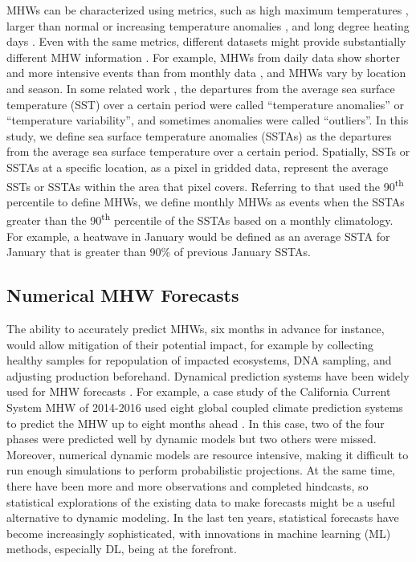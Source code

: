 \documentclass[11pt, a4paper]{article}
\begin{document}
MHWs can be characterized using metrics, such as high maximum temperatures \citep{berkelmans2004comparison}, larger than normal or increasing temperature anomalies \citep{smale2013extreme}, and long degree heating days \citep{maynard2008reeftemp}. Even with the same metrics, different datasets might provide substantially different MHW information \citep{hobday2016hierarchical}. For example, MHWs from daily data show shorter and more intensive events than from monthly data \citep{hobday2016hierarchical}, and MHWs vary by location and season. In some related work \citep{ham2019deep,pravallika2022prediction,taylor2022deep}, the departures from the average sea surface temperature (SST) over a certain period were called ``temperature anomalies'' or ``temperature variability'', and sometimes anomalies were called ``outliers''. In this study, we define sea surface temperature anomalies (SSTAs) as the departures from the average sea surface temperature over a certain period. Spatially, SSTs or SSTAs at a specific location, as a pixel in gridded data, represent the average SSTs or SSTAs within the area that pixel covers. Referring to \citet{hobday2016hierarchical} that used the 90\textsuperscript{th} percentile to define MHWs, we define monthly MHWs as events when the SSTAs greater than the 90\textsuperscript{th} percentile of the SSTAs based on a monthly climatology. For example, a heatwave in January would be defined as an average SSTA for January that is greater than 90\% of previous January SSTAs.

\subsection{Numerical MHW Forecasts}

The ability to accurately predict MHWs, six months in advance for instance, would allow mitigation of their potential impact, for example by collecting healthy samples for repopulation of impacted ecosystems, DNA sampling, and adjusting production beforehand. Dynamical prediction systems have been widely used for MHW forecasts \citep{merryfield2013canadian,saha2014ncep,vecchi2014seasonal}. For example, a case study of the California Current System MHW of 2014-2016 used eight global coupled climate prediction systems to predict the MHW up to eight months ahead \citep{jacox2019predicting}. In this case, two of the four phases were predicted well by dynamic models but two others were missed. Moreover, numerical dynamic models are resource intensive, making it difficult to run enough simulations to perform probabilistic projections. At the same time, there have been more and more observations and completed hindcasts, so statistical explorations of the existing data to make forecasts might be a useful alternative to dynamic modeling. In the last ten years, statistical forecasts have become increasingly sophisticated, with innovations in machine learning (ML) methods, especially DL, being at the forefront.
\end{document}
